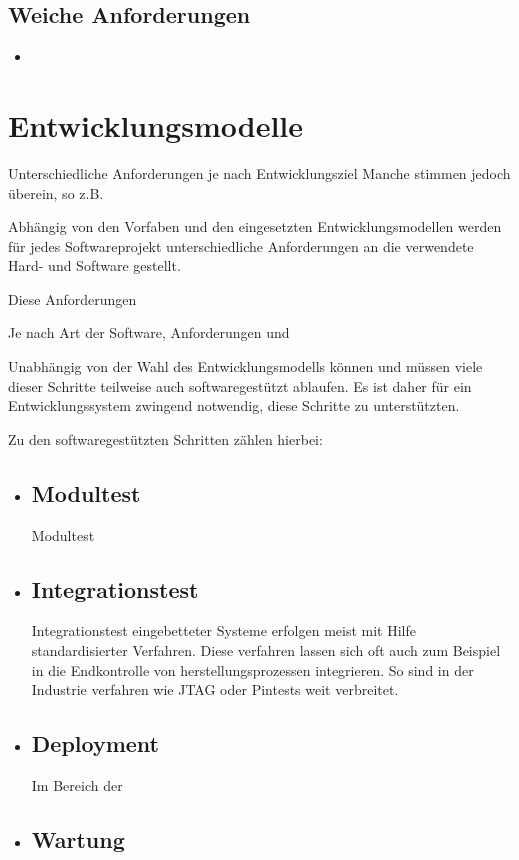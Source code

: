 \subsection{Weiche Anforderungen}
\begin{itemize}
  \item 
\end{itemize}


\section{Entwicklungsmodelle}
Unterschiedliche Anforderungen je nach Entwicklungsziel
Manche stimmen jedoch überein, so z.B.
  



Abhängig von den Vorfaben und den eingesetzten Entwicklungsmodellen werden
für jedes Softwareprojekt unterschiedliche Anforderungen an die verwendete Hard-
und Software gestellt.

Diese Anforderungen 

 Je nach Art der Software, Anforderungen und

Unabhängig von der Wahl des Entwicklungsmodells können und
müssen viele dieser Schritte teilweise auch softwaregestützt ablaufen. Es ist
daher für ein Entwicklungssystem zwingend notwendig, diese Schritte zu
unterstützten.

Zu den softwaregestützten Schritten zählen hierbei:
\begin{itemize}
  \item \subsection*{Modultest} Modultest
  \item \subsection*{Integrationstest} Integrationstest eingebetteter Systeme
  erfolgen meist mit Hilfe standardisierter Verfahren. Diese verfahren lassen
  sich oft auch zum Beispiel in die Endkontrolle von herstellungsprozessen
  integrieren. So sind in der Industrie verfahren wie JTAG oder Pintests weit
  verbreitet.
  \item \subsection*{Deployment} Im Bereich der 
  \item \subsection*{Wartung}
\end{itemize}

